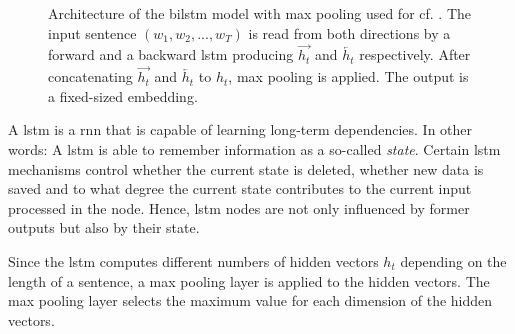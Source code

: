 \begin{figure}[htp] %
    \centering
    
    \caption[Architecture of \infersent{}]{Architecture of the \ac{bilstm} model with max pooling used for \infersent{} cf. \cite{inferSent2018}.
    The input sentence $(w_1, w_2, ..., w_T)$ is read from both directions by a forward and a backward \ac{lstm} 
    producing $\overrightarrow{h_t}$ and $\overleftarrow{h_t}$ respectively.
    After concatenating $\overrightarrow{h_t}$ and $\overleftarrow{h_t}$ to $h_t$, max pooling is applied.
    The output is a fixed-sized embedding.
    }
    \label{fig:infersent_bilstm}
\end{figure}

A \ac{lstm} is a \ac{rnn} that is capable of learning long-term dependencies.
In other words: 
A \ac{lstm} is able to remember information as a so-called \textit{state}.
Certain \ac{lstm} mechanisms control whether the current state is deleted, whether new data is saved and 
to what degree the current state contributes to the current input processed in the node.
Hence, \ac{lstm} nodes are not only influenced by former outputs but also by their state.

Since the \ac{lstm} computes different numbers of hidden vectors $h_t$ depending on the length of a sentence, a max pooling layer is applied to the hidden vectors.
The max pooling layer selects the maximum value for each dimension of the hidden vectors.

